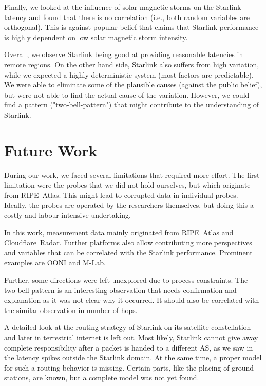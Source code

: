 Finally, we looked at the influence of solar magnetic storms on the Starlink
latency and found that there is no correlation (i.e., both random
variables are orthogonal). This is against popular belief that claims that
Starlink performance is highly dependent on low solar magnetic storm intensity.

Overall, we observe Starlink being good at providing reasonable latencies in
remote regions. On the other hand side, Starlink also suffers from high
variation, while we expected a highly deterministic system (most factors are
predictable). We were able to eliminate some of the plausible causes (against
the public belief), but were not able to find the actual cause of the
variation. However, we could find a pattern ("two-bell-pattern") that might
contribute to the understanding of Starlink.

\section{Future Work}

During our work, we faced several limitations that required more effort. The
first limitation were the probes that we did not hold ourselves, but which
originate from RIPE~Atlas. This might lead to corrupted data in individual
probes. Ideally, the probes are operated by the researchers themselves, but
doing this a costly and labour-intensive undertaking.


In this work, measurement data mainly originated from RIPE~Atlas and
Cloudflare~Radar. Further platforms also allow contributing more perspectives
and variables that can be correlated with the Starlink performance. Prominent
examples are OONI and M-Lab.

Further, some directions were left unexplored due to process constraints. The
two-bell-pattern is an interesting observation that needs confirmation and
explanation as it was not clear why it occurred. It should also be correlated
with the similar observation in number of hops.

A detailed look at the routing strategy of Starlink on its satellite
constellation and later in terrestrial internet is left out. Most likely,
Starlink cannot give away complete responsibility after a packet is handed to a
different AS, as we saw in the latency spikes outside the Starlink domain. At
the same time, a proper model for such a routing behavior is missing. Certain
parts, like the placing of ground stations, are known, but a complete model was
not yet found.

